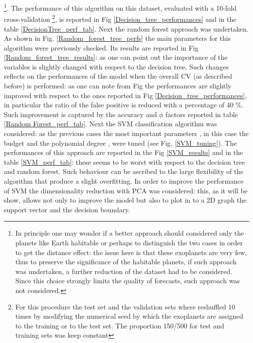 \documentclass[
12pt, %
a4paper, %
oneside, %
headinclude,footinclude, %
BCOR5mm, %
]{scrartcl}
\begin{document}
\footnote{In principle one may wonder if a better approach should considered only the planets like Earth habitable or perhaps to distinguish the two cases in order to get the distance effect: the issue here is that these exoplanets are very few, thus to preserve the significance of the habitable planets, if such approach was undertaken, a further reduction of the dataset had to be considered. Since this choice strongly limits the quality of forecasts, such approach was not considered.}. The performance of this algorithm on this dataset, evaluated with a 10-fold cross-validation \footnote{For this procedure the test set and the validation sets where reshuffled 10 times by modifying the numerical seed by which the exoplanets are assigned to the training or to the test set. The proportion 150/500 for test and training sets was keep constant}, is reported in Fig \ref{Decision_tree_performances} and in the table \ref{DecisionTree_perf_tab}. Next the random forest approach was undertaken. As shown in Fig. \ref{Random_forest_tree_perfs} the main parameters for this algorithm were previously checked. Its results are reported in Fig \ref{Random_forest_tree_results}: as one can point out the importance of the variables is slightly changed with respect to the decision tree. Such changes reflects on the performances of the model when the overall CV (as described before) is performed: as one can note from Fig the performances are slightly improved with respect to the ones reported in Fig \ref{Decision_tree_performances}, in particular the ratio of the false positive is reduced with a percentage of 40 $\%$. Such improvement is captured by the accuracy and $\phi$ factors reported in table \ref{Random Forest_perf_tab}. Next the SVM classification algorithm was considered: as the previous cases the most important parameters , in this case the budget and the polynomial degree , were tuned (see Fig. \ref{SVM_tuning}). The performances of this approach are reported in the Fig \ref{SVM_results} and in the table \ref{SVM_perf_tab}: these seems to be worst with respect to the decision tree and random forest. Such behaviour can be ascribed to the large flexibility of the algorithm that produce a slight overfitting. In order to improve the performance of SVM the dimensionality reduction with PCA was considered: this, as it will be show, allows not only to improve the model but also to plot in to a 2D graph the support vector and the decision boundary. 




\clearpage
\end{document}

